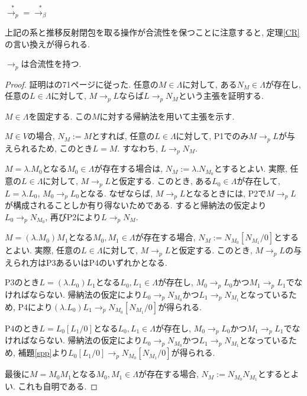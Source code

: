 \documentclass[12pt, titlepage]{ltjsarticle}
\begin{document}
\begin{cor}
 $\overset{*}{\rightarrow_{p}} = \overset{*}{\rightarrow_{\beta}}$
\end{cor}

上記の系と推移反射閉包を取る操作が合流性を保つことに注意すると, 定理\ref{CR}の言い換えが得られる.

\begin{thm}\label{CR'}
 $\rightarrow_{p}$は合流性を持つ.
\end{thm}

\begin{proof}
 証明は\cite{高橋正子1991計算論}の71ページに従った.
任意の$M \in \Lambda$に対して, ある$N_M \in \Lambda$が存在し, 任意の$L \in \Lambda$に対して, $M \rightarrow_p L$ならば$L \rightarrow_p N_M$という主張を証明する.

$M \in \Lambda$を固定する. この$M$に対する帰納法を用いて主張を示す.

$M \in V$の場合, $N_M := M$とすれば, 任意の$L \in \Lambda$に対して, P1でのみ$M \rightarrow_p L$が与えられるため, このとき$L = M$. すなわち, $L \rightarrow_p N_M$.

$M = \lambda. M_0$となる$M_0 \in \Lambda$が存在する場合は, $N_M := \lambda. N_{M_0}$とするとよい.
実際, 任意の$L \in \Lambda$に対して, $M \rightarrow_p L$と仮定する.
このとき, ある$L_0 \in \Lambda$が存在して, $L = \lambda. L_0$, $M_0 \rightarrow_p L_0$となる.
なぜならば, $M \rightarrow_p L$となるときには, P2で$M \rightarrow_p L$が構成されることしか有り得ないためである.
すると帰納法の仮定より$L_0 \rightarrow_p N_{M_0}$, 再びP2により$L \rightarrow_p N_M$.

$M = (\lambda. M_0) M_1$となる$M_0, M_1 \in \Lambda$が存在する場合, $N_M := N_{M_0}[N_{M_1}/0]$とするとよい. 実際, 任意の$L \in \Lambda$に対して, $M \rightarrow_p L$と仮定する. このとき, $M \rightarrow_p L$の与えられ方はP3あるいはP4のいずれかとなる.

 P3のとき$L = (\lambda. L_0) L_1$となる$L_0, L_1 \in \Lambda$が存在し, $M_0 \rightarrow_p L_0$かつ$M_1 \rightarrow_p L_1$でなければならない. 帰納法の仮定により$L_0 \rightarrow_p N_{M_0}$かつ$L_1 \rightarrow_p N_{M_1}$となっているため, P4により$(\lambda. L_0) L_1 \rightarrow_p N_{M_0} [N_{M_1}/0]$が得られる.

 P4のとき$L = L_0 [L_1/0]$となる$L_0, L_1 \in \Lambda$が存在し, $M_0 \rightarrow_p L_0$かつ$M_1 \rightarrow_p L_1$でなければならない. 帰納法の仮定により$L_0 \rightarrow_p N_{M_0}$かつ$L_1 \rightarrow_p N_{M_1}$となっているため, 補題\ref{spp}より$L_0 [L_1/0] \rightarrow_p N_{M_0} [N_{M_1}/0]$が得られる.

最後に$M = M_0 M_1$となる$M_0, M_1 \in \Lambda$が存在する場合, $N_M := N_{M_0} N_{M_1}$とするとよい. これも自明である.
\end{proof}
\end{document}
